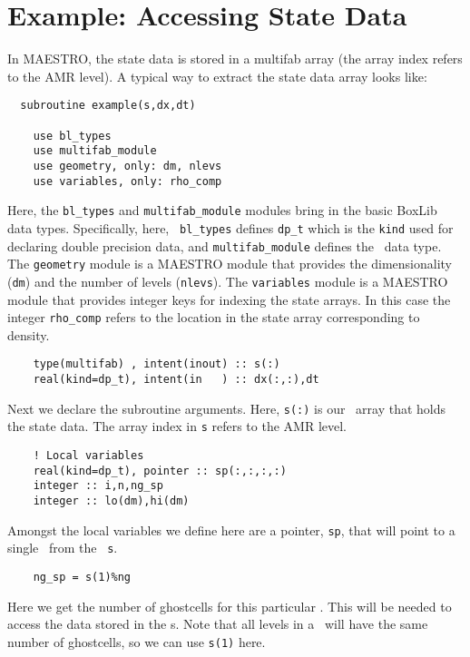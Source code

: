 \section{Example: Accessing State Data}

In MAESTRO, the state data is stored in a multifab array (the array
index refers to the AMR level).  A typical way to extract the state data
array looks like:

\begin{verbatim}
  subroutine example(s,dx,dt)

    use bl_types
    use multifab_module
    use geometry, only: dm, nlevs
    use variables, only: rho_comp
\end{verbatim}

\noindent Here, the {\tt bl\_types} and {\tt multifab\_module} modules
bring in the basic BoxLib data types. Specifically, here, {\tt
bl\_types} defines {\tt dp\_t} which is the {\tt kind} used for
declaring double precision data, and {\tt multifab\_module} defines
the \multifab\ data type.  The {\tt geometry} module is a MAESTRO
module that provides the dimensionality ({\tt dm}) and the number of 
levels ({\tt nlevs}).  The {\tt variables} module is a MAESTRO
module that provides integer keys for indexing the state arrays.  In
this case the integer {\tt rho\_comp} refers to the location in the
state array corresponding to density.

\begin{verbatim}
    type(multifab) , intent(inout) :: s(:)
    real(kind=dp_t), intent(in   ) :: dx(:,:),dt
\end{verbatim}

\noindent Next we declare the subroutine arguments.  Here, {\tt s(:)}
is our \multifab\ array that holds the state data.  The array index
in {\tt s} refers to the AMR level.

\begin{verbatim}
    ! Local variables
    real(kind=dp_t), pointer :: sp(:,:,:,:)
    integer :: i,n,ng_sp
    integer :: lo(dm),hi(dm)
\end{verbatim}

\noindent Amongst the local variables we define here are a pointer,
{\tt sp}, that will point to a single \fab\ from the
\multifab\ {\tt s}.

\begin{verbatim}
    ng_sp = s(1)%ng
\end{verbatim}

\noindent Here we get the number of ghostcells for this particular
\multifab.  This will be needed to access the data stored in the
\fab s.  Note that all levels in a \multifab\ will have the same
number of ghostcells, so we can use {\tt s(1)} here.

